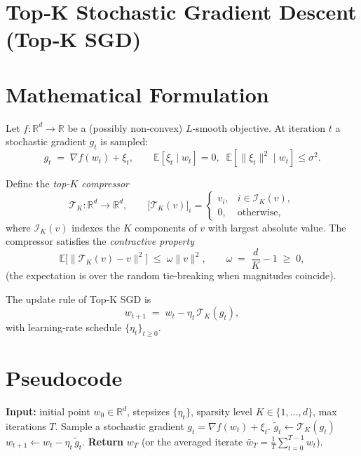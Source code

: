 \documentclass{article}
\newcommand{\TopK}{\mathcal{T}_K}
\newcommand{\E}{\mathbb{E}}
\newcommand{\R}{\mathbb{R}}
\begin{document}
\section*{Top‑K Stochastic Gradient Descent (Top‑K SGD)}

\section*{Mathematical Formulation}
Let $f:\R^{d}\rightarrow\R$ be a (possibly non‑convex) $L$‑smooth objective.  
At iteration $t$ a stochastic gradient $g_t$ is sampled:
\[
g_t \;=\; \nabla f(w_t) + \xi_t,
\qquad 
\E[\xi_t\mid w_t]=0,\;\;
\E[\|\xi_t\|^{2}\mid w_t]\le\sigma^{2}.
\]

Define the \emph{top‑$K$ compressor}
\[
\TopK:\R^{d}\rightarrow\R^{d},\qquad
\big[\TopK(v)\big]_i=\begin{cases}
v_i, & i\in\mathcal{I}_K(v),\\[2pt]
0,   & \text{otherwise},
\end{cases}
\]
where $\mathcal{I}_K(v)$ indexes the $K$ components of $v$ with largest absolute value.
The compressor satisfies the \emph{contractive property}
\begin{equation}
\label{eq:contract}
\E\!\big[\|\TopK(v)-v\|^{2}\big]\;\le\;\omega\|v\|^{2},
\qquad\omega\;=\;\frac{d}{K}-1\;\ge\;0,
\end{equation}
(the expectation is over the random tie‑breaking when magnitudes coincide).

The update rule of Top‑K SGD is
\begin{equation}
\label{eq:update}
w_{t+1}\;=\;w_t-\eta_t\,\TopK(g_t),
\end{equation}
with learning‑rate schedule $\{\eta_t\}_{t\ge0}$.

\section*{Pseudocode}
\begin{algorithm}[H]
\caption{Top‑K SGD}
\begin{algorithmic}[1]
\State \textbf{Input:} initial point $w_0\in\R^{d}$, stepsizes $\{\eta_t\}$, sparsity level $K\in\{1,\dots ,d\}$, max iterations $T$.
    \State Sample a stochastic gradient $g_t=\nabla f(w_t)+\xi_t$.
    \State $\displaystyle \tilde g_t\gets\TopK(g_t)$ \hfill{}
    \State $w_{t+1}\gets w_t-\eta_t\,\tilde g_t$.
\EndFor
\State \textbf{Return} $w_T$ (or the averaged iterate $\bar w_T=\frac1T\sum_{t=0}^{T-1}w_t$).
\end{algorithmic}
\end{algorithm}
\end{document}
